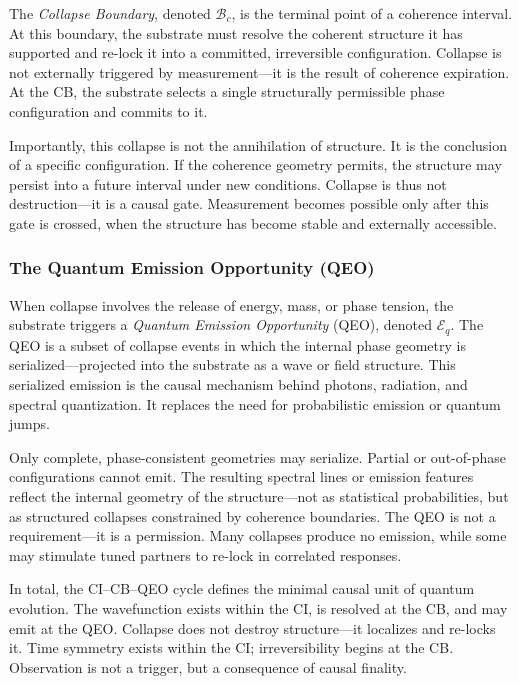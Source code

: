 \documentclass[preprints,article,submit,pdftex,moreauthors]{Definitions/mdpi}
\begin{document}
The \textit{Collapse Boundary}, denoted \( \mathcal{B}_c \), is the terminal point of a coherence interval. At this boundary, the substrate must resolve the coherent structure it has supported and re-lock it into a committed, irreversible configuration. Collapse is not externally triggered by measurement—it is the result of coherence expiration. At the CB, the substrate selects a single structurally permissible phase configuration and commits to it.

Importantly, this collapse is not the annihilation of structure. It is the conclusion of a specific configuration. If the coherence geometry permits, the structure may persist into a future interval under new conditions. Collapse is thus not destruction—it is a causal gate. Measurement becomes possible only after this gate is crossed, when the structure has become stable and externally accessible.

\subsubsection{The Quantum Emission Opportunity (QEO)}

When collapse involves the release of energy, mass, or phase tension, the substrate triggers a \textit{Quantum Emission Opportunity} (QEO), denoted \( \mathcal{E}_q \). The QEO is a subset of collapse events in which the internal phase geometry is serialized—projected into the substrate as a wave or field structure. This serialized emission is the causal mechanism behind photons, radiation, and spectral quantization. It replaces the need for probabilistic emission or quantum jumps.

Only complete, phase-consistent geometries may serialize. Partial or out-of-phase configurations cannot emit. The resulting spectral lines or emission features reflect the internal geometry of the structure—not as statistical probabilities, but as structured collapses constrained by coherence boundaries. The QEO is not a requirement—it is a permission. Many collapses produce no emission, while some may stimulate tuned partners to re-lock in correlated responses.

\smallskip

In total, the CI–CB–QEO cycle defines the minimal causal unit of quantum evolution. The wavefunction exists within the CI, is resolved at the CB, and may emit at the QEO. Collapse does not destroy structure—it localizes and re-locks it. Time symmetry exists within the CI; irreversibility begins at the CB. Observation is not a trigger, but a consequence of causal finality.
\end{document}
